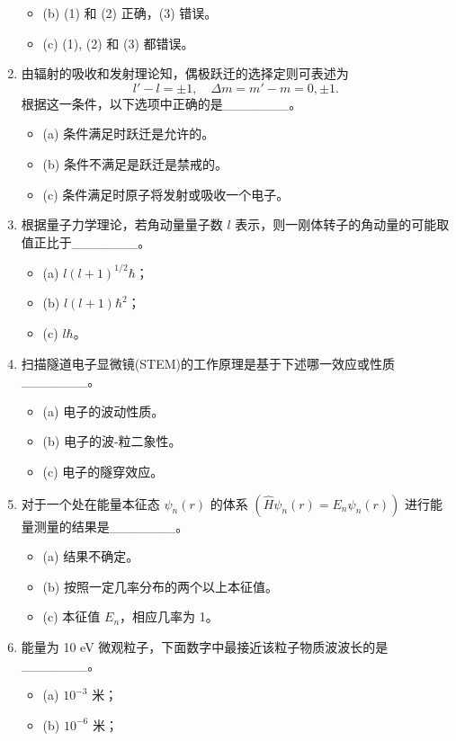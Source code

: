 \begin{enumerate}
\begin{itemize}
        \item (b) (1) 和 (2) 正确，(3) 错误。
        \item (c) (1), (2) 和 (3) 都错误。
    \end{itemize}
    \item 由辐射的吸收和发射理论知，偶极跃迁的选择定则可表述为\[
l' - l = \pm1, \quad \Delta m = m' - m = 0, \pm1.~\]
根据这一条件，以下选项中正确的是_______。
     \begin{itemize}
        \item (a) 条件满足时跃迁是允许的。
        \item (b) 条件不满足是跃迁是禁戒的。
        \item (c) 条件满足时原子将发射或吸收一个电子。
    \end{itemize}
    \item 根据量子力学理论，若角动量量子数 $l$ 表示，则一刚体转子的角动量的可能取值正比于_______。
         \begin{itemize}
        \item (a) $l(l+1)^{1/2}\hbar$；
        \item (b) $l(l+1)\hbar^2$；
        \item (c) $l\hbar$。
    \end{itemize}
    \item 扫描隧道电子显微镜(STEM)的工作原理是基于下述哪一效应或性质_______。
         \begin{itemize}
        \item (a) 电子的波动性质。
        \item (b) 电子的波-粒二象性。
        \item (c) 电子的隧穿效应。
    \end{itemize}
    \item 对于一个处在能量本征态 $\psi_n(r)$ 的体系 $\left( \hat{H} \psi_n(r) = E_n \psi_n(r) \right)$ 进行能量测量的结果是_______。
    \begin{itemize}
    \item (a) 结果不确定。
    \item (b) 按照一定几率分布的两个以上本征值。
    \item (c) 本征值 $E_n$，相应几率为 1。
\end{itemize}
    \item 能量为 10 eV 微观粒子，下面数字中最接近该粒子物质波波长的是_______。 
    \begin{itemize}
    \item (a) $10^{-3}$ 米；
    \item (b) $10^{-6}$ 米；

\end{itemize}
\end{enumerate}
